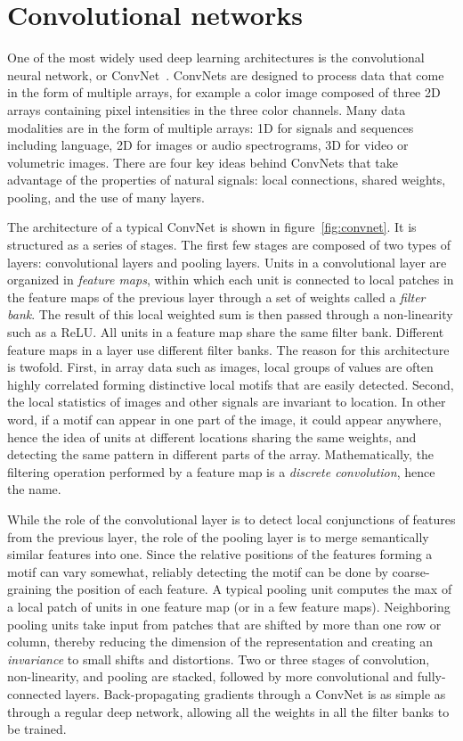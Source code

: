 \documentclass[10pts]{article}
\begin{document}
\section{Convolutional networks}

One of the most widely used deep learning architectures is the
convolutional neural network, or
ConvNet~\cite{lecun-90c,lecun-98}. ConvNets are designed to process
data that come in the form of multiple arrays, for example a color
image composed of three 2D arrays containing pixel intensities in the
three color channels. Many data modalities are in the form of multiple
arrays: 1D for signals and sequences including language, 2D for images
or audio spectrograms, 3D for video or volumetric images.  There are
four key ideas behind ConvNets that take advantage of the properties
of natural signals: local connections, shared weights,
pooling, and the use of many layers.

The architecture of a typical ConvNet is shown in
figure~\ref{fig:convnet}.  It is structured as a series of stages. The
first few stages are composed of two types of layers: convolutional
layers and pooling layers. Units in a convolutional layer are
organized in {\em feature maps}, within which each unit is connected
to local patches in the feature maps of the previous layer through a
set of weights called a {\em filter bank}. The result of this local
weighted sum is then passed through a non-linearity such as a ReLU.  All
units in a feature map share the same filter bank. Different feature
maps in a layer use different filter banks. The reason for this
architecture is twofold. First, in array data such as images, local
groups of values are often highly correlated forming distinctive local
motifs that are easily detected. Second, the local statistics of
images and other signals are invariant to location. In other word, if
a motif can appear in one part of the image, it could appear anywhere,
hence the idea of units at different locations sharing the same
weights, and detecting the same pattern in different parts of the
array.  Mathematically, the filtering operation performed by a feature
map is a {\em discrete convolution}, hence the name.

While the role of the convolutional layer is to detect local
conjunctions of features from the previous layer, the role of the
pooling layer is to merge semantically similar features into
one. Since the relative positions of the features forming a motif can
vary somewhat, reliably detecting the motif can be done by
coarse-graining the position of each feature. A typical pooling unit
computes the max of a local patch of units in one feature map (or in a
few feature maps). Neighboring pooling units take input from patches
that are shifted by more than one row or column, thereby reducing the
dimension of the representation and creating an {\em invariance} to
small shifts and distortions.  Two or three stages of convolution,
non-linearity, and pooling are stacked, followed by more convolutional
and fully-connected layers.  Back-propagating gradients through a
ConvNet is as simple as through a regular deep network, allowing all
the weights in all the filter banks to be trained. 
\end{document}

